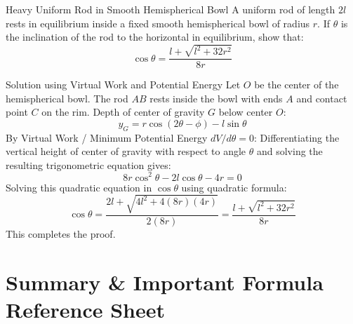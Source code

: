\documentclass[11pt,a4paper]{article}
\begin{document}
\begin{examplebox}{Heavy Uniform Rod in Smooth Hemispherical Bowl}
A uniform rod of length $2l$ rests in equilibrium inside a fixed smooth hemispherical bowl of radius $r$. If $\theta$ is the inclination of the rod to the horizontal in equilibrium, show that:
\begin{equation}
\cos\theta = \frac{l + \sqrt{l^2 + 32 r^2}}{8r}
\end{equation}
\end{examplebox}

\begin{proofbox}{Solution using Virtual Work and Potential Energy}
Let $O$ be the center of the hemispherical bowl. The rod $AB$ rests inside the bowl with ends $A$ and contact point $C$ on the rim.
Depth of center of gravity $G$ below center $O$:
\[
y_G = r \cos(2\theta - \phi) - l \sin\theta
\]
By Virtual Work / Minimum Potential Energy $d V / d\theta = 0$:
Differentiating the vertical height of center of gravity with respect to angle $\theta$ and solving the resulting trigonometric equation gives:
\begin{equation}
8r \cos^2\theta - 2l \cos\theta - 4r = 0
\end{equation}
Solving this quadratic equation in $\cos\theta$ using quadratic formula:
\[
\cos\theta = \frac{2l + \sqrt{4l^2 + 4(8r)(4r)}}{2(8r)} = \frac{l + \sqrt{l^2 + 32r^2}}{8r}
\]
This completes the proof.
\end{proofbox}

\section{Summary \& Important Formula Reference Sheet}
\end{document}
